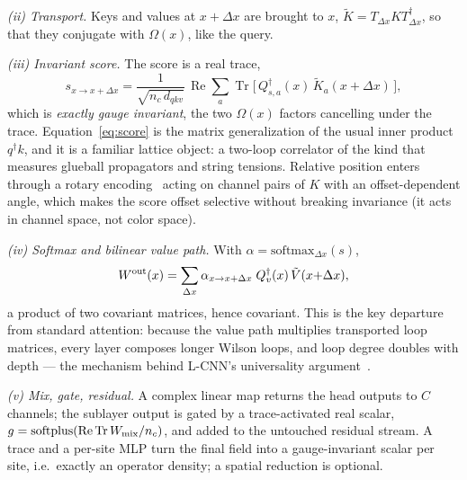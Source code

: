 \documentclass[aps,prl,reprint,superscriptaddress,nofootinbib]{revtex4-2}
\newcommand{\Tr}{\operatorname{Tr}}
\begin{document}
\emph{(ii) Transport.} Keys and values at $x+\Delta x$ are brought to $x$,
$\tilde K = T_{\Delta x}K T^\dagger_{\Delta x}$, so that they conjugate with
$\Omega(x)$, like the query.

\emph{(iii) Invariant score.} The score is a real trace,
\begin{equation}
  s_{x\to x+\Delta x}
  =\frac{1}{\sqrt{n_c\,d_{qkv}}}\,
  \operatorname{Re}\sum_a\Tr\!\big[\,Q_{s,a}^\dagger(x)\,\tilde K_a(x{+}\Delta x)\,\big],
  \label{eq:score}
\end{equation}
which is \emph{exactly gauge invariant}, the two $\Omega(x)$ factors cancelling
under the trace. Equation~\eqref{eq:score} is the matrix generalization of the
usual inner product $q^\dagger k$, and it is a familiar lattice object: a
two-loop correlator of the kind that measures glueball propagators and string
tensions. Relative position enters through a rotary encoding~\cite{RoPE2021}
acting on channel pairs of $K$ with an offset-dependent angle, which makes the
score offset selective without breaking invariance (it acts in channel space,
not color space).

\emph{(iv) Softmax and bilinear value path.} With
$\alpha=\mathrm{softmax}_{\Delta x}(s)$,
\begin{equation}
  W^{\rm out}(x)=\sum_{\Delta x}\alpha_{x\to x+\Delta x}\;
  Q_v^\dagger(x)\,\tilde V(x{+}\Delta x),
  \label{eq:value}
\end{equation}
a product of two covariant matrices, hence covariant. This is the key departure
from standard attention: because the value path multiplies transported loop
matrices, every layer composes longer Wilson loops, and loop degree doubles with
depth --- the mechanism behind L-CNN's universality argument~\cite{Favoni2022}.

\emph{(v) Mix, gate, residual.} A complex linear map returns the head
outputs to $C$ channels; the sublayer output is gated by a trace-activated real
scalar, $g=\mathrm{softplus}(\operatorname{Re}\Tr W_{\rm mix}/n_c)$, and added to
the untouched residual stream. A trace and a per-site MLP turn the final field
into a gauge-invariant scalar per site, i.e.\ exactly an operator density; a
spatial reduction is optional.
\end{document}
